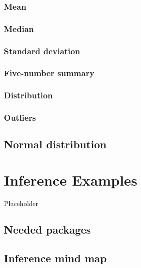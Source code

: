 \documentclass[
  12pt, krantz2,
]{krantz}
\begin{document}
\hypertarget{mean}{%
\subsection{Mean}\label{mean}}

\hypertarget{median}{%
\subsection{Median}\label{median}}

\hypertarget{standard-deviation}{%
\subsection{Standard deviation}\label{standard-deviation}}

\hypertarget{five-number-summary}{%
\subsection{Five-number summary}\label{five-number-summary}}

\hypertarget{distribution}{%
\subsection{Distribution}\label{distribution}}

\hypertarget{outliers}{%
\subsection{Outliers}\label{outliers}}

\hypertarget{normal-curve}{%
\section{Normal distribution}\label{normal-curve}}

\hypertarget{appendixB}{%
\chapter{Inference Examples}\label{appendixB}}

Placeholder

\hypertarget{needed-packages-10}{%
\section*{Needed packages}\label{needed-packages-10}}


\hypertarget{inference-mind-map}{%
\section{Inference mind map}\label{inference-mind-map}}
\end{document}

